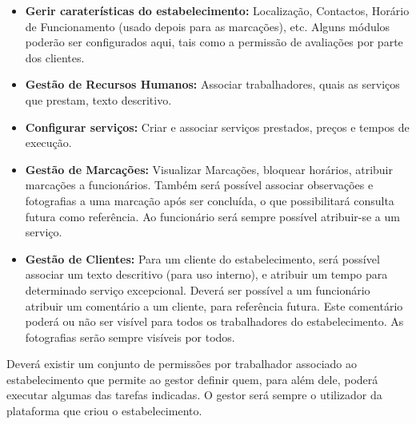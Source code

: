 \documentclass[12pt]{article}
\begin{document}
	\begin{itemize}
		\item \textbf{Gerir caraterísticas do estabelecimento:} Localização, Contactos, 
			Horário de Funcionamento (usado depois para as marcações), etc. Alguns módulos poderão ser configurados
			aqui, tais como a permissão de avaliações por parte dos clientes.
		\item \textbf{Gestão de Recursos Humanos:} Associar trabalhadores, 
			quais as serviços que prestam, texto descritivo.
		\item \textbf{Configurar serviços:} Criar e associar serviços prestados, 
			preços e tempos de execução.
		\item \textbf{Gestão de Marcações:} Visualizar Marcações, bloquear horários, atribuir marcações
			a funcionários. Também será possível associar observações e fotografias a uma marcação após ser 
			concluída, o que possibilitará consulta futura como referência. Ao funcionário será sempre possível
			atribuir-se a um serviço.
		\item \textbf{Gestão de Clientes:} Para um cliente do estabelecimento, será possível associar um texto
			descritivo (para uso interno), e atribuir um tempo para determinado serviço excepcional. Deverá ser possível
			a um funcionário atribuir um comentário a um cliente, para referência futura. Este comentário poderá ou não
			ser visível para todos os trabalhadores do estabelecimento. As fotografias serão sempre visíveis por todos.
	\end{itemize}

	Deverá existir um conjunto de permissões por trabalhador associado ao estabelecimento que permite ao gestor
	definir quem, para além dele, poderá executar algumas das tarefas indicadas. O gestor será sempre o utilizador
	da plataforma que criou o estabelecimento.
\end{document}
